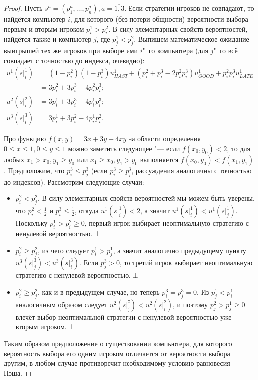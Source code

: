 \begin{proof}
	Пусть $s^a = (p_1^a, \ldots, p_n^a), a = \overline{1,3}$. Если стратегии игроков не совпадают, то найдётся компьютер $i$, для которого (без потери общности) вероятности выбора первым и вторым игроком $p_i^1 > p_i^2$. В силу элементарных свойств вероятностей, найдётся также и компьютер $j$, где $p_j^1 < p_j^2$. Выпишем математическое ожидание выигрышей тех же игроков при выборе ими $i$"~го компьютера (для $j$"~го всё совпадает с точностью до индекса, очевидно):
	\begin{align*}
		u^1(\left. s \right|^1_i) &= (1 - p_i^2) (1 - p_i^3) u^1_{HAST} + (p_i^2 + p_i^3 - 2 p_i^2 p_i^3) u^1_{GOOD} + p_i^2 p_i^3 u^1_{LATE}\\ &= 3 p_i^2 + 3 p_i^3 - 4 p_i^2 p_i^3;\\
		u^2(\left. s \right|^2_i) &= 3 p_i^1 + 3 p_i^3 - 4 p_i^1 p_i^3;\\
		u^3(\left. s \right|^3_i) &= 3 p_i^1 + 3 p_i^2 - 4 p_i^1 p_i^2.
	\end{align*}
	
	Про функцию $f(x,y) = 3x + 3y - 4xy$ на области определения $0 \le x \le 1, 0 \le y \le 1$ можно заметить следующее "--- если $f(x_0, y_0) < 2$, то для любых $x_1 > x_0, y_1 \ge y_0$ или $x_1 \ge x_0, y_1 > y_0$ выполняется $f(x_0, y_0) < f(x_1, y_1)$. Предположим, что $p_i^3 \le p_j^3$ (если $p_i^3 \ge p_j^3$, рассуждения аналогичны с точностью до индексов). Рассмотрим следующие случаи:
	\begin{itemize}
		\item $p_i^2 < p_j^2$. В силу элементарных свойств вероятностей мы можем быть уверены, что $p_i^2 < \frac{1}{2}$ и $p_i^3 \le \frac{1}{2}$, откуда $u^1(\left. s \right|^1_i) < 2$, а значит $u^1(\left. s \right|^1_i) < u^1(\left. s \right|^1_j)$. Поскольку $p_i^1 > p_i^2 \ge 0$, первый игрок выбирает неоптимальную стратегию с ненулевой вероятностью. $\bot$
		\item $p_i^2 \ge p_j^2$, из чего следует $p_i^1 > p_j^1$, а значит аналогично предыдущему пункту $u^3(\left. s \right|^3_j) < u^3(\left. s \right|^3_i)$. Если $p_j^3 > 0$, то третий игрок выбирает неоптимальную стратегию с ненулевой вероятностью. $\bot$
		\item $p_i^2 \ge p_j^2$, как и в предыдущем случае, но теперь $p_i^3 = p_j^3 = 0$. Из $p_j^1 < p_i^1$ аналогичным образом следует $u^2(\left. s \right|^2_j) < u^2(\left. s \right|^2_i)$, и поэтому $p_j^2 > p_j^1 \ge 0$ влечёт выбор неоптимальной стратегии с ненулевой вероятностью уже вторым игроком. $\bot$
	\end{itemize}
	
	Таким образом предположение о существовании компьютера, для которого вероятность выбора его одним игроком отличается от вероятности выбора другим, в любом случае противоречит необходимому условию равновесия Нэша.
\end{proof}


